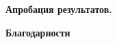 \begin{center}
\textbf{Апробация результатов.}
\end{center}


\begin{center}
\textbf{Благодарности}
\end{center}




